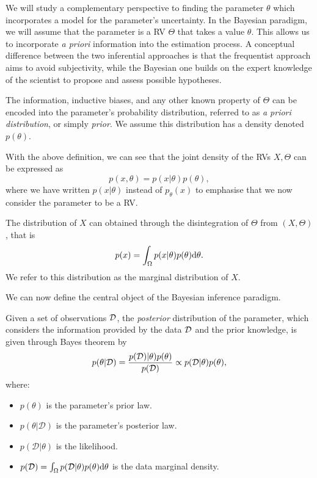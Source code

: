 We will study a complementary perspective to finding the parameter $\theta$ which incorporates a model for the parameter's uncertainty. In the Bayesian paradigm, we will assume that the parameter is a RV $\Theta$ that takes a value $\theta$. This allows us to incorporate \emph{a priori} information into the estimation process. A conceptual difference between the two inferential approaches is that the frequentist approach aims to avoid subjectivity, while the Bayesian one builds on the expert knowledge of the scientist to propose and assess possible hypotheses.


\begin{definition}
The information, inductive biases, and any other known property of $\Theta$ can be encoded into the parameter's probability distribution, referred to as \emph{a priori distribution}, or simply \emph{prior}. We assume this distribution  has a density denoted $p(\theta)$.
\end{definition}

With the above definition, we can see that the joint density of the RVs $X,\Theta$ can be expressed as
\begin{equation}
    p(x,\theta) = p(x|\theta)p(\theta),
    \label{eq:joint_bayes}
\end{equation}
where we have written $p(x|\theta)$ instead of $p_\theta(x)$ to emphasise that we now consider the parameter to be a RV. 

\begin{definition}
The distribution of $X$ can obtained through the disintegration of $\Theta$ from $(X,\Theta)$, that is 
\begin{equation}
    p(x) = \int_\Omega p(x|\theta)p(\theta){\text d}\theta.
\end{equation}
We refer to this distribution as the marginal distribution of $X$.
\end{definition}


We can now define the central object of the Bayesian inference paradigm. 

\begin{definition}
\label{dist_posterior}
Given a set of observations ${\mathcal D}$, the \emph{posterior} distribution of the parameter, which considers the information provided by the data ${\mathcal D}$ and the prior knowledge, is given through Bayes theorem by
\begin{align}
    p(\theta|{\mathcal D}) = \frac{p({\mathcal D})|\theta)p(\theta)}{p({\mathcal D})}  \propto p(\mathcal{D}|\theta) p(\theta) \label{eq:posterior_def},
\end{align}
where: 
\begin{itemize}
    \item $p(\theta)$ is the parameter's prior law.
    \item $p(\theta|\mathcal{D})$ is the parameter's posterior law.
    \item $p(\mathcal{D}|\theta)$ is the likelihood.
    \item $p(\mathcal{D}) = \int_\Omega p(\mathcal{D}|\theta)p(\theta){\text d} \theta $ is the data marginal density.
\end{itemize}
\end{definition}


